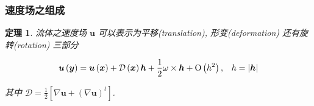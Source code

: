 \documentclass[aspectratio=2516]{beamer}
\newtheorem{thm}{\kaishu 定理}
\begin{document}
\begin{frame}
\frametitle{ \kaishu 速度场之组成}
\begin{thm}
	
	\kaishu 
	
	流体之速度场 $ \boldsymbol{u} $ 可以表示为平移(translation), 形变(deformation) 还有旋转(rotation) 三部分
	
	\begin{equation}
	\boldsymbol{u}\left( \boldsymbol{y} \right) = \boldsymbol{u}\left( \boldsymbol{x} \right) + \mathcal{D}\left( \boldsymbol{x} \right)\boldsymbol{h} + \frac{1}{2}\omega  \times \boldsymbol{h} + {\rm O}\left( {h{}^2} \right),\;\;\;h = \left| \boldsymbol{h} \right|
	\label{eq5.3.2}
	\end{equation}
	
	其中 $\mathcal{D} = \frac{1}{2}\left[ {\nabla \boldsymbol{u} + {{\left( {\nabla \boldsymbol{u}} \right)}^t}} \right]$.
	\label{thm5.3.1}
\end{thm}

\end{frame}

\end{document}
